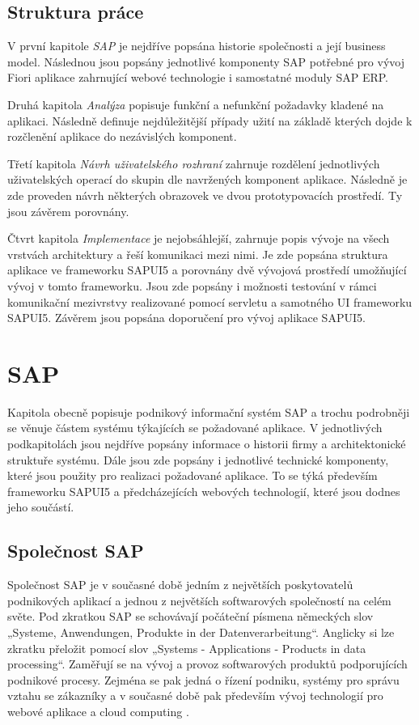 \documentclass[thesis=M,czech]{FITthesis}[2012/06/26]
\begin{document}
\begin{introduction}
\section{Struktura práce}
V první kapitole \textit{SAP} je nejdříve popsána historie společnosti a její business model. Následnou jsou popsány jednotlivé komponenty SAP potřebné pro vývoj Fiori aplikace zahrnující webové technologie i samostatné moduly SAP ERP. 

Druhá kapitola \textit{Analýza} popisuje funkční a nefunkční požadavky kladené na aplikaci. Následně definuje nejdůležitější případy užití na základě kterých dojde k rozčlenění aplikace do nezávislých komponent. 

Třetí kapitola \textit{Návrh uživatelského rozhraní} zahrnuje rozdělení jednotlivých uživatelských operací do skupin dle navržených komponent aplikace. Následně je zde proveden návrh některých obrazovek ve dvou prototypovacích prostředí. Ty jsou závěrem porovnány.

Čtvrt kapitola \textit{Implementace} je nejobsáhlejší, zahrnuje popis vývoje na všech vrstvách architektury a řeší komunikaci mezi nimi. Je zde popsána struktura aplikace ve frameworku SAPUI5 a porovnány dvě vývojová prostředí umožňující vývoj v tomto frameworku. Jsou zde popsány i možnosti testování v rámci komunikační mezivrstvy realizované pomocí servletu a samotného UI frameworku SAPUI5. Závěrem jsou popsána doporučení pro vývoj aplikace SAPUI5.
\end{introduction}

\chapter{SAP}
Kapitola obecně popisuje podnikový informační systém SAP a trochu podrobněji se věnuje částem systému týkajících se požadované aplikace. V jednotlivých podkapitolách jsou nejdříve popsány informace o historii firmy a architektonické struktuře systému. Dále jsou zde popsány i jednotlivé technické komponenty, které jsou použity pro realizaci požadované aplikace. To se týká především frameworku SAPUI5 a předcházejících webových technologií, které jsou dodnes jeho součástí.

\section{Společnost SAP}
Společnost SAP je v současné době jedním z největších poskytovatelů podnikových aplikací a jednou z největších softwarových společností na celém světe. Pod zkratkou SAP se schovávají počáteční písmena německých slov „Systeme, Anwendungen, Produkte in der Datenverarbeitung“. Anglicky si lze zkratku přeložit pomocí slov „Systems - Applications - Products in data processing“. Zaměřují se na vývoj a provoz softwarových produktů podporujících podnikové procesy. Zejména se pak jedná o řízení podniku, systémy pro správu vztahu se zákazníky a v současné době pak především vývoj technologií pro webové aplikace a cloud computing \cite{sap_information}.
\end{document}
